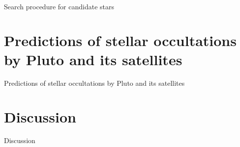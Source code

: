 \begin{frame}[c]{Search procedure for candidate stars}
	
\end{frame}


\section{Predictions of stellar occultations by Pluto and its satellites}

\begin{frame}[c]{Predictions of stellar occultations by Pluto and its satellites}

\end{frame}





\section{Discussion}

\begin{frame}[t]{Discussion}{}

\end{frame}

